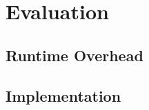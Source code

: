 %    

%    
    




%

%    
    
%    






\chapter{Evaluation}
\label{ch:evaluation-analysis}


\section{Runtime Overhead}
\label{sec:runtime-overhead}


\section{Implementation}
\label{sec:implementation}



